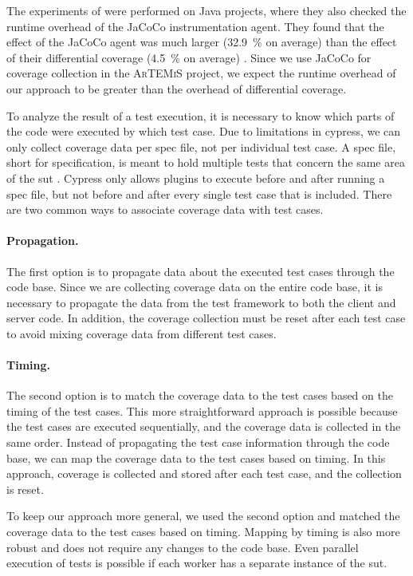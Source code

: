 The experiments of \citeauthor*{bell_deflaker_2018} were performed on Java projects, where they also checked the runtime overhead of the JaCoCo instrumentation agent.
They found that the effect of the JaCoCo agent was much larger (\SI{32.9}{\percent} on average) than the effect of their differential coverage (\SI{4.5}{\percent} on average) \autocite{bell_deflaker_2018}.
Since we use JaCoCo for coverage collection in the \textsc{ArTEMiS} project, we expect the runtime overhead of our approach to be greater than the overhead of differential coverage.

To analyze the result of a test execution, it is necessary to know which parts of the code were executed by which test case.
Due to limitations in cypress, we can only collect coverage data per spec file, not per individual test case.
A spec file, short for specification, is meant to hold multiple tests that concern the same area of the \ac{sut} \autocite{noauthor_writing_nodate}.
Cypress only allows plugins to execute before and after running a spec file, but not before and after every single test case that is included.
There are two common ways to associate coverage data with test cases.

\paragraph{Propagation.} The first option is to propagate data about the executed test cases through the code base.
Since we are collecting coverage data on the entire code base, it is necessary to propagate the data from the test framework to both the client and server code.
In addition, the coverage collection must be reset after each test case to avoid mixing coverage data from different test cases.

\paragraph{Timing.} The second option is to match the coverage data to the test cases based on the timing of the test cases.
This more straightforward approach is possible because the test cases are executed sequentially, and the coverage data is collected in the same order.
Instead of propagating the test case information through the code base, we can map the coverage data to the test cases based on timing.
In this approach, coverage is collected and stored after each test case, and the collection is reset.

To keep our approach more general, we used the second option and matched the coverage data to the test cases based on timing.
Mapping by timing is also more robust and does not require any changes to the code base.
Even parallel execution of tests is possible if each worker has a separate instance of the \ac{sut}.

